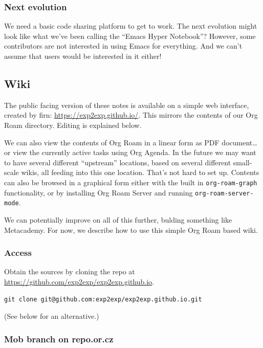 \documentclass[11pt]{article}
\begin{document}
\subsubsection{Next evolution}
\label{sec:orgc213fdf}

We need a basic code sharing platform to get to work.  The next
evolution might look like what we’ve been calling the “Emacs Hyper
Notebook”?  However, some contributors are not interested in using
Emacs for everything.  And we can’t assume that users would be
interested in it either!
\subsection{Wiki}
\label{sec:org675d604}
The public facing version of these notes is available on a simple web
interface, created by firn: \href{https://exp2exp.github.io/}{https://exp2exp.github.io/}. This mirrors
the contents of our Org Roam directory.  Editing is explained below.

We can also view the contents of Org Roam in a linear form as PDF
document\ldots{} or view the currently active tasks using Org Agenda.  In
the future we may want to have several different “upstream” locations,
based on several different small-scale wikis, all feeding into this
one location.  That’s not hard to set up.  Contents can also be
browsed in a graphical form either with the built in \texttt{org-roam-graph}
functionality, or by installing Org Roam Server and running
\texttt{org-roam-server-mode}.

We can potentially improve on all of this further, bulding something
like Metacademy.  For now, we describe how to use this simple Org Roam
based wiki.

\subsubsection{Access}
\label{sec:org0e0c9bf}

Obtain the sources by cloning the repo at \href{https://github.com/exp2exp/exp2exp.github.io}{https://github.com/exp2exp/exp2exp.github.io}.

\begin{verbatim}
git clone git@github.com:exp2exp/exp2exp.github.io.git
\end{verbatim}

(See below for an alternative.)

\subsubsection{Mob branch on repo.or.cz}
\label{sec:orgab6b465}
\end{document}
